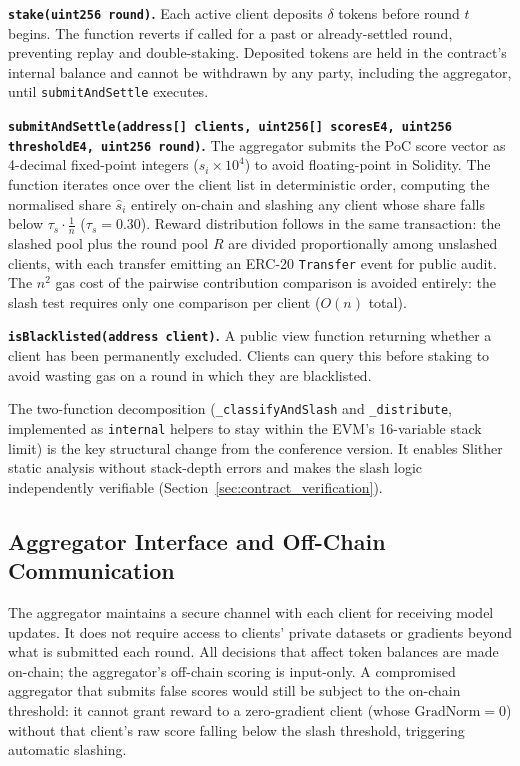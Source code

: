 \documentclass[journal]{IEEEtran}
\theoremstyle{definition}
\theoremstyle{remark}
\begin{document}
\textbf{\texttt{stake(uint256 round)}.}
Each active client deposits $\delta$ tokens before round $t$ begins.
The function reverts if called for a past or already-settled round,
preventing replay and double-staking.
Deposited tokens are held in the contract's internal balance and
cannot be withdrawn by any party, including the aggregator, until
\texttt{submitAndSettle} executes.

\textbf{\texttt{submitAndSettle(address[] clients, uint256[] scoresE4, uint256 thresholdE4, uint256 round)}.}
The aggregator submits the PoC score vector as 4-decimal fixed-point
integers ($s_i \times 10^4$) to avoid floating-point in Solidity.
The function iterates once over the client list in deterministic
order, computing the normalised share $\hat{s}_i$ entirely on-chain
and slashing any client whose share falls below
$\tau_s \cdot \frac{1}{n}$ ($\tau_s = 0.30$).
Reward distribution follows in the same transaction: the slashed
pool plus the round pool $R$ are divided proportionally among
unslashed clients, with each transfer emitting an ERC-20
\texttt{Transfer} event for public audit.
The $n^2$ gas cost of the pairwise contribution comparison is avoided
entirely: the slash test requires only one comparison per client
($O(n)$ total).

\textbf{\texttt{isBlacklisted(address client)}.}
A public view function returning whether a client has been
permanently excluded. Clients can query this before staking to
avoid wasting gas on a round in which they are blacklisted.

The two-function decomposition (\texttt{\_classifyAndSlash} and
\texttt{\_distribute}, implemented as \texttt{internal} helpers to
stay within the EVM's 16-variable stack limit) is the key structural
change from the conference version.
It enables Slither static analysis without stack-depth errors and
makes the slash logic independently verifiable
(Section~\ref{sec:contract_verification}).

\subsection{Aggregator Interface and Off-Chain Communication}

The aggregator maintains a secure channel with each client for
receiving model updates.
It does not require access to clients' private datasets or gradients
beyond what is submitted each round.
All decisions that affect token balances are made on-chain;
the aggregator's off-chain scoring is input-only.
A compromised aggregator that submits false scores would still be
subject to the on-chain threshold: it cannot grant reward to a
zero-gradient client (whose $\mathrm{GradNorm} = 0$) without that
client's raw score falling below the slash threshold, triggering
automatic slashing.
\end{document}
